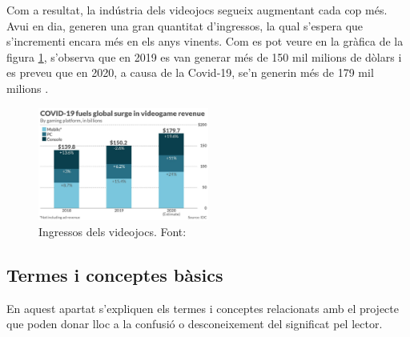 \documentclass[a4paper]{article}
\begin{document}
Com a resultat, la indústria dels videojocs segueix augmentant cada cop més. Avui en dia, generen una gran quantitat d'ingressos, la qual s'espera que s'incrementi encara més en els anys vinents. Com es pot veure en la gràfica de la figura \ref{fig:VideogamesRevenuesImage}, s'observa que en 2019 es van generar més de 150 mil milions de dòlars i es preveu que en 2020, a causa de la Covid-19, se'n generin més de 179 mil milions \cite{VidogamesMoreMoney}. 

\begin{figure}[H]
    \centering
    \includegraphics[width=0.5\textwidth]{images/videogamesMoney.jpeg}
    \caption{Ingressos dels videojocs. Font: \cite{VidogamesMoreMoney}}
    \label{fig:VideogamesRevenuesImage}
\end{figure}

\subsection{Termes i conceptes bàsics}
En aquest apartat s'expliquen els termes i conceptes relacionats amb el projecte que poden donar lloc a la confusió o desconeixement del significat pel lector.
\end{document}
